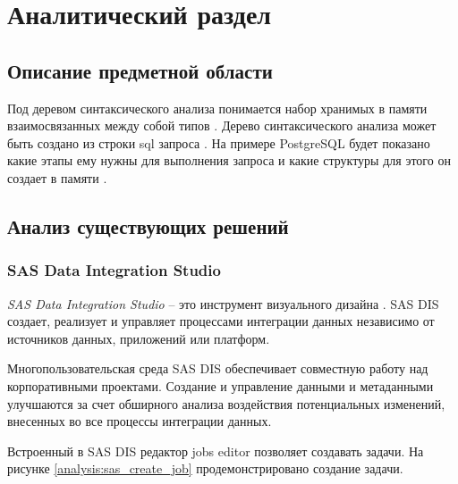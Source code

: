 
\chapter{Аналитический раздел}
\label{cha:analysis}

\section{Описание предметной области}

Под деревом синтаксического анализа понимается набор хранимых 
в памяти взаимосвязанных между собой типов \cite{bib7}. 
Дерево синтаксического анализа может быть создано из строки sql запроса \cite{bib8}.
На примере PostgreSQL \cite{bib9} будет показано
какие этапы ему нужны для выполнения запроса 
и какие структуры для этого он создает в памяти \cite{bib10}. 

 

\section{Анализ существующих решений}

\subsection{SAS Data Integration Studio}

\textit{SAS Data Integration Studio} -- это инструмент визуального дизайна \cite{bib2}.  
SAS DIS создает, реализует и управляет процессами интеграции данных независимо от источников данных, приложений или платформ.

Многопользовательская среда SAS DIS обеспечивает совместную работу над корпоративными проектами.
Создание и управление данными и метаданными улучшаются за счет обширного анализа воздействия потенциальных изменений, внесенных во все процессы интеграции данных.

Встроенный в SAS DIS редактор jobs editor позволяет создавать задачи.
На рисунке \ref{analysis:sas_create_job} продемонстрировано создание задачи.

